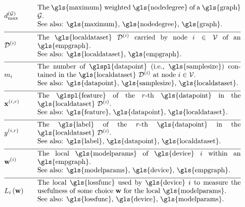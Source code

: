 \begin{align} 
	&\maxnodedegree^{(\graph)} & \quad & \parbox{.85\textwidth}{The \gls{maximum} weighted \gls{nodedegree} of a \gls{graph} $\graph$.
		\\ See also: \gls{maximum}, \gls{nodedegree}, \gls{graph}. } \nonumber \\[2mm] \hline \nonumber\\[-5mm] 
	&\localdataset{\nodeidx} & \quad & \parbox{.85\textwidth}{The \gls{localdataset} $\localdataset{\nodeidx}$ carried by 
		node $\nodeidx\in \nodes$ of an \gls{empgraph}.
		\\ See also: \gls{localdataset}, \gls{empgraph}. } \nonumber \\[2mm] \hline \nonumber\\[-5mm]
	&\localsamplesize{\nodeidx} & \quad & \parbox{.85\textwidth}{The number of \glspl{datapoint} (i.e., \gls{samplesize}) contained in the 
		\gls{localdataset} $\localdataset{\nodeidx}$ at node $\nodeidx\in \nodes$.
		\\ See also: \gls{datapoint}, \gls{samplesize}, \gls{localdataset}. } \nonumber \\[2mm] \hline \nonumber\\[-5mm]
	&\featurevec^{(\nodeidx,\sampleidx)} & \quad & \parbox{.85\textwidth}{The \glspl{feature} of the $\sampleidx$-th \gls{datapoint} in 
		the \gls{localdataset} $\localdataset{\nodeidx}$.
		\\ See also: \gls{feature}, \gls{datapoint}, \gls{localdataset}. } \nonumber \\[2mm] \hline \nonumber\\[-5mm]
	&\truelabel^{(\nodeidx,\sampleidx)} & \quad & \parbox{.85\textwidth}{The \gls{label} of the $\sampleidx$-th \gls{datapoint} in 
		the \gls{localdataset} $\localdataset{\nodeidx}$.
		\\ See also: \gls{label}, \gls{datapoint}, \gls{localdataset}. } \nonumber \\[2mm] \hline \nonumber\\[-5mm]
	&\localparams{\nodeidx} & \quad & \parbox{.85\textwidth}{The local \gls{modelparams} of \gls{device} $\nodeidx$ within an \gls{empgraph}.
		\\ See also: \gls{modelparams}, \gls{device}, \gls{empgraph}. } \nonumber \\[2mm] \hline \nonumber\\[-5mm]
	&\locallossfunc{\nodeidx}{\weights} & \quad & \parbox{.85\textwidth}{The local \gls{lossfunc} used by \gls{device} $\nodeidx$ 
		to measure the usefulness of some choice $\weights$ for the local \gls{modelparams}.
		\\ See also: \gls{lossfunc}, \gls{device}, \gls{modelparams}. }\nonumber 
\end{align} 

